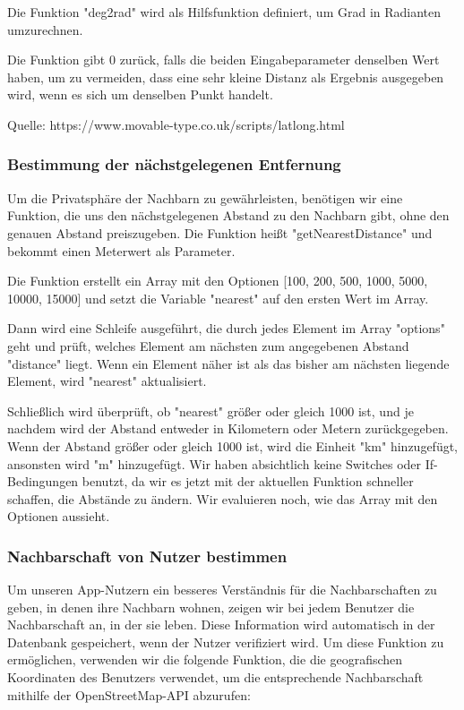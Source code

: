 Die Funktion "deg2rad" wird als Hilfsfunktion definiert, um Grad in Radianten umzurechnen.

Die Funktion gibt 0 zurück, falls die beiden
Eingabeparameter denselben Wert haben, um zu vermeiden, dass
eine sehr kleine Distanz als Ergebnis ausgegeben wird, wenn
es sich um denselben Punkt handelt.

Quelle: https://www.movable-type.co.uk/scripts/latlong.html

\subsubsection{Bestimmung der nächstgelegenen Entfernung}

Um die Privatsphäre der Nachbarn zu gewährleisten, benötigen wir eine Funktion, die uns den nächstgelegenen Abstand zu den Nachbarn gibt, ohne den genauen Abstand preiszugeben. Die Funktion heißt "getNearestDistance" und bekommt einen Meterwert als Parameter.

Die Funktion erstellt ein Array mit den Optionen [100, 200, 500, 1000, 5000, 10000, 15000] und setzt die Variable "nearest" auf den ersten Wert im Array.

Dann wird eine Schleife ausgeführt, die durch jedes Element im Array "options" geht und prüft, welches Element am nächsten zum angegebenen Abstand "distance" liegt. Wenn ein Element näher ist als das bisher am nächsten liegende Element, wird "nearest" aktualisiert.

Schließlich wird überprüft, ob "nearest" größer oder gleich
1000 ist, und je nachdem wird der Abstand entweder in
Kilometern oder Metern zurückgegeben. Wenn der Abstand
größer oder gleich 1000 ist, wird die Einheit "km"
hinzugefügt, ansonsten wird "m" hinzugefügt. Wir haben
absichtlich keine Switches oder If-Bedingungen benutzt, da
wir es jetzt mit der aktuellen Funktion schneller schaffen,
die Abstände zu ändern. Wir evaluieren noch, wie das Array
mit den Optionen aussieht.


\subsubsection{Nachbarschaft von Nutzer bestimmen}
Um unseren App-Nutzern ein besseres Verständnis für die Nachbarschaften zu geben, in denen ihre Nachbarn wohnen, zeigen wir bei jedem Benutzer die Nachbarschaft an, in der sie leben. Diese Information wird automatisch in der Datenbank gespeichert, wenn der Nutzer verifiziert wird. Um diese Funktion zu ermöglichen, verwenden wir die folgende Funktion, die die geografischen Koordinaten des Benutzers verwendet, um die entsprechende Nachbarschaft mithilfe der OpenStreetMap-API abzurufen:

